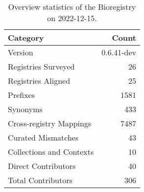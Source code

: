 \begin{table}
\centering
\caption{Overview statistics of the Bioregistry on 2022-12-15.}
\label{tab:bioregistry-summary}
\begin{tabular}{lr}
\toprule
                Category &      Count \\
\midrule
                 Version & 0.6.41-dev \\
     Registries Surveyed &         26 \\
      Registries Aligned &         25 \\
                Prefixes &       1581 \\
                Synonyms &        433 \\
 Cross-registry Mappings &       7487 \\
      Curated Mismatches &         43 \\
Collections and Contexts &         10 \\
     Direct Contributors &         40 \\
      Total Contributors &        306 \\
\bottomrule
\end{tabular}
\end{table}
